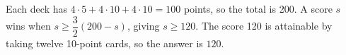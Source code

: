 Each deck has $ 4\cdot5+4\cdot10+4\cdot10=100 $ points, so the total is 200. A score $ s $ wins when $ s\ge\dfrac{3}{2}(200-s)$, giving $ s\ge120 $. The score 120 is attainable by taking twelve 10-point cards, so the answer is $\boxed{120}$.
